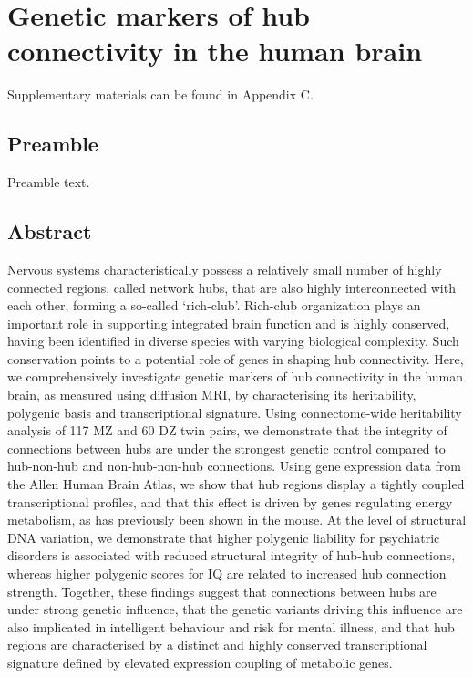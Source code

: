 \chapter{Genetic markers of hub connectivity in the human brain}
\label{ch:Chapter5}



Supplementary materials can be found in Appendix C.

\section*{Preamble}
Preamble text.

\newpage

\section*{Abstract}
Nervous systems characteristically possess a relatively small number of highly connected regions, called network hubs, that are also highly interconnected with each other, forming a so-called `rich-club’. Rich-club organization plays an important role in supporting integrated brain function and is highly conserved, having been identified in diverse species with varying biological complexity. Such conservation points to a potential role of genes in shaping hub connectivity. Here, we comprehensively investigate genetic markers of hub connectivity in the human brain, as measured using diffusion MRI, by characterising its heritability, polygenic basis and transcriptional signature. Using connectome-wide heritability analysis of 117 MZ and 60 DZ twin pairs, we demonstrate that the integrity of connections between hubs are under the strongest genetic control compared to hub-non-hub and non-hub-non-hub connections. Using gene expression data from the Allen Human Brain Atlas, we show that hub regions display a tightly coupled transcriptional profiles, and that this effect is driven by genes regulating energy metabolism, as has previously been shown in the mouse. At the level of structural DNA variation, we demonstrate that higher polygenic liability for psychiatric disorders is associated with reduced structural integrity of hub-hub connections, whereas higher polygenic scores for IQ are related to increased hub connection strength. Together, these findings suggest that connections between hubs are under strong genetic influence, that the genetic variants driving this influence are also implicated in intelligent behaviour and risk for mental illness, and that hub regions are characterised by a distinct and highly conserved transcriptional signature defined by elevated expression coupling of metabolic genes. 

